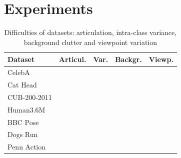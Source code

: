 \chapter{Experiments}
%
\begin{table}
	\caption{Difficulties of datasets: articulation, intra-class variance, background clutter and viewpoint variation}
	\label{tab:challenges}
	\begin{tabular}{l|rrrr}
		Dataset &  Articul.& Var. &  Backgr.& Viewp.  \\ \hline
		CelebA &   &  &  &    \\
		Cat Head & &  \checkmark&  &   \\
		CUB-200-2011 & & \checkmark& \checkmark&   \\
		Human3.6M &\checkmark& &  & \checkmark  \\
		BBC Pose &  \checkmark&  & \checkmark&  \\
		Dogs Run & \checkmark& \checkmark& \checkmark&   \\
		Penn Action & \checkmark& \checkmark& \checkmark& \checkmark\\
	\end{tabular}
\end{table}
%
